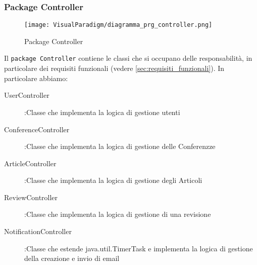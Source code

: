 \subsubsection{Package Controller}

\label{fig:package_controller_prg_image}
\begin{figure}[ht]
  \centering
  \texttt{[image: VisualParadigm/diagramma\_prg\_controller.png]}
  \caption{Package Controller}
  \label{fig:Package Controller}
\end{figure}

Il \texttt{package Controller} contiene le classi che si occupano delle
responsabilità, in particolare dei requisiti funzionali (vedere \ref{sec:requisiti_funzionali}).
In particolare abbiamo:
\begin{description}
\item[UserController] :Classe che implementa la logica di gestione utenti
\item[ConferenceController] :Classe che implementa la logica di gestione delle Conferenzze
\item[ArticleController] :Classe che implementa la logica di gestione degli Articoli
\item[ReviewController] :Classe che implementa la logica di gestione di una revisione
\item[NotificationController] :Classe che estende java.util.TimerTask e implementa la logica di gestione della creazione e invio di email
\end{description}

